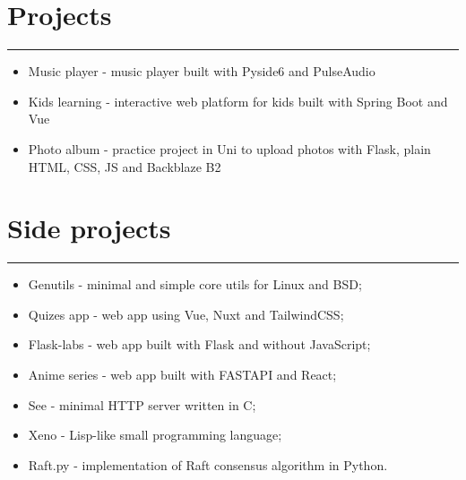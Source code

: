 {
    \section*{Projects}
    \par\noindent\rule{\textwidth}{0.1mm}
    \begin{itemize}
        \item {Music player - music player built with Pyside6 and PulseAudio}
        \item {Kids learning - interactive web platform for kids built with Spring Boot and Vue}
        \item {
            Photo album - practice project in Uni to upload photos with Flask, 
            plain HTML, CSS, JS and Backblaze B2
        }
    \end{itemize}

    \section*{Side projects}
    \par\noindent\rule{\textwidth}{0.1mm}
    \begin{itemize}
        \item {Genutils - minimal and simple core utils for Linux and BSD};
        \item {Quizes app - web app using Vue, Nuxt and TailwindCSS};
        \item {Flask-labs - web app built with Flask and without JavaScript};
        \item {Anime series - web app built with FASTAPI and React};
        \item {See - minimal HTTP server written in C};
        \item {Xeno - Lisp-like small programming language};
        \item {Raft.py - implementation of Raft consensus algorithm in Python}.
    \end{itemize}
}
